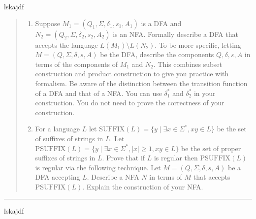 \documentclass[11pt]{article}
\begin{document}
\begin{solution}
    lskajdf
\end{solution}


\begin{quote}
    \begin{enumerate}
  \item Suppose $M_1=(Q_1,\Sigma, \delta_1, s_1, A_1)$ is a DFA and
    $N_2=(Q_2,\Sigma, \delta_2, s_2, A_2)$ is an NFA. Formally
    describe a DFA that accepts the language
    $L(M_1) \setminus L(N_2)$. To be more specific, letting
    $M = (Q,\Sigma,\delta,s,A)$ be the DFA, describe the components
    $Q,\delta,s,A$ in terms of the components of $M_1$ and $N_2$.
    This combines subset construction and product construction to give
    you practice with formalism. Be aware of the distinction between
    the transition function of a DFA and that of a NFA. You can use
    $\delta_1^*$ and $\delta_2^*$ in your construction. You do not
    need to prove the correctness of your construction.
  \item For a language $L$ let
    $\text{SUFFIX}(L) = \{ y \mid \exists x \in \Sigma^*, xy \in L\}$ be
    the set of suffixes of strings in $L$.  Let
    $\text{PSUFFIX}(L) = \{ y \mid \exists x \in \Sigma^*, |x| \ge 1, xy
    \in L\}$ be the set of proper suffixes of strings in $L$.  Prove
    that if $L$ is regular then $\text{PSUFFIX}(L)$ is regular via the
    following technique.  Let $M=(Q,\Sigma,\delta,s,A)$ be a DFA
    accepting $L$. Describe a NFA $N$ in terms of $M$ that accepts
    $\text{PSUFFIX}(L)$. Explain the construction of your NFA.
  \end{enumerate}
\end{quote}
\hrule



\begin{solution}
    lskajdf
\end{solution}
\end{document}
